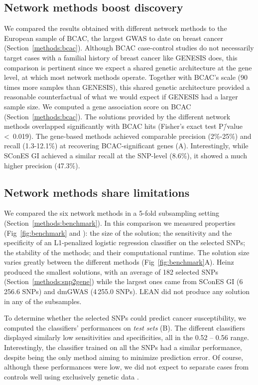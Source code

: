 \documentclass[10pt,letterpaper]{article}
\begin{document}
\subsection{Network methods boost discovery}
\label{results:boost}

We compared the results obtained with different network methods to the European sample of BCAC, the largest GWAS to date on breast cancer (Section~\ref{methods:bcac}). Although BCAC case-control studies do not necessarily target cases with a familial history of breast cancer like GENESIS does, this comparison is pertinent since we expect a shared genetic architecture at the gene level, at which most network methods operate. Together with BCAC's scale (90 times more samples than GENESIS), this shared genetic architecture provided a reasonable counterfactual of what we would expect if GENESIS had a larger sample size. We computed a gene association score on BCAC (Section~\ref{methods:bcac}). The solutions provided by the different  network methods overlapped significantly with BCAC hits (Fisher's exact test P\=/value \textless~0.019). The gene-based methods achieved comparable precision (2\%-25\%) and recall (1.3-12.1\%) at recovering BCAC-significant genes (A). Interestingly, while SConES GI achieved a similar recall at the SNP-level (8.6\%), it showed a much higher precision (47.3\%).

\subsection{Network methods share limitations}
\label{results:benchmark}

We compared the six network methods in a 5-fold subsampling setting (Section~\ref{methods:benchmark}). In this comparison we measured properties (Fig~\ref{fig:benchmark} and ): the size of the solution; the sensitivity and the specificity of an L1-penalized logistic regression classifier on the selected SNPs; the stability of the methods; and their computational runtime. The solution size varies greatly between the different methods (Fig~\ref{fig:benchmark}A). Heinz produced the smallest solutions, with an average of 182 selected SNPs (Section~\ref{methods:snp2gene}) while the largest ones came from SConES GI (6\,256.6 SNPs) and dmGWAS (4\,255.0 SNPs). LEAN did not produce any solution in any of the subsamples. 

To determine whether the selected SNPs could predict cancer susceptibility, we computed the classifiers' performances on \emph{test sets} (B). The different classifiers displayed similarly low sensitivities and specificities, all in the 0.52 -- 0.56 range. Interestingly, the classifier trained on all the SNPs had a similar performance, despite being the only method aiming to minimize prediction error. Of course, although these performances were low, we did not expect to separate cases from controls well using exclusively genetic data \cite{deloscamposComplexTraitPredictionEra2018}.
\end{document}
